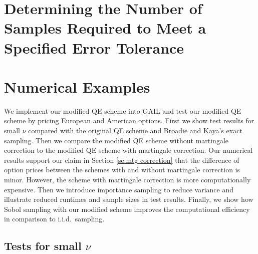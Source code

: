 \documentclass{ws-ijfe}
\begin{document}
\section{Determining the Number of Samples Required to Meet a Specified Error Tolerance}



\section{Numerical Examples}

We implement our modified QE scheme into GAIL and test our modified QE scheme by pricing European and American options. First we show test results for small $\nu$ compared with the original QE scheme and Broadie and Kaya's exact sampling. Then we compare the modified QE scheme without martingale correction to the modified QE scheme with martingale correction. Our numerical results support our claim in Section \ref{se:mtg correction} that the difference of option prices between the schemes with and without martingale correction is minor. However, the scheme with martingale correction is more computationally expensive. Then we introduce importance sampling to reduce variance and illustrate reduced runtimes and sample sizes in test results. Finally, we show how Sobol sampling with our modified scheme improves the computational efficiency in comparison to i.i.d.\ sampling.

\subsection{Tests for small $\nu$}
\end{document}
